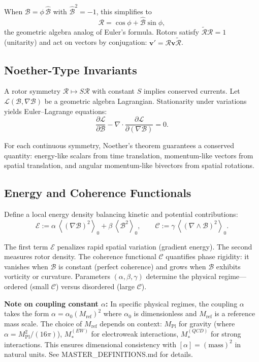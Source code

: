\documentclass[11pt,a4paper]{article}
\newcommand{\grade}[2]{\left\langle #1 \right\rangle_{#2}}
\newcommand{\scal}[1]{\grade{#1}{0}}
\newcommand{\rev}[1]{\widetilde{#1}}           %
\newcommand{\Rotor}{\mathcal{R}}
\newcommand{\Biv}{\mathcal{B}}
\newcommand{\D}{\nabla}                        %
\theoremstyle{definition}
\theoremstyle{plain}
\theoremstyle{remark}
\begin{document}
When $\Biv = \phi\,\hat{\Biv}$ with $\hat{\Biv}^2 = -1$, this simplifies to
\begin{equation}
\Rotor = \cos\phi + \hat{\Biv}\sin\phi,
\end{equation}
the geometric algebra analog of Euler's formula. Rotors satisfy $\rev{\Rotor}\Rotor = 1$ (unitarity) and act on vectors by conjugation: $\mathbf{v}' = \Rotor \mathbf{v} \rev{\Rotor}$.

\subsection{Noether-Type Invariants}

A rotor symmetry $\Rotor\mapsto S\Rotor$ with constant $S$ implies conserved currents. Let $\mathcal{L}(\Biv,\D\Biv)$ be a geometric algebra Lagrangian. Stationarity under variations yields Euler--Lagrange equations:
\begin{equation}
\frac{\partial \mathcal{L}}{\partial \Biv} - \D \cdot \frac{\partial \mathcal{L}}{\partial (\D\Biv)} = 0.
\end{equation}

For each continuous symmetry, Noether's theorem guarantees a conserved quantity: energy-like scalars from time translation, momentum-like vectors from spatial translation, and angular momentum-like bivectors from spatial rotations.

\subsection{Energy and Coherence Functionals}

Define a local energy density balancing kinetic and potential contributions:
\begin{equation}
  \mathcal{E} := \alpha\, \scal{(\D \Biv)^2} + \beta\, \scal{\Biv^2},
  \qquad
  \mathcal{C} := \gamma\, \scal{(\D\wedge\Biv)^2}.
\end{equation}

The first term $\mathcal{E}$ penalizes rapid spatial variation (gradient energy). The second measures rotor density. The coherence functional $\mathcal{C}$ quantifies phase rigidity: it vanishes when $\Biv$ is constant (perfect coherence) and grows when $\Biv$ exhibits vorticity or curvature. Parameters $(\alpha,\beta,\gamma)$ determine the physical regime---ordered (small $\mathcal{C}$) versus disordered (large $\mathcal{C}$).

\textbf{Note on coupling constant $\alpha$:} In specific physical regimes, the coupling $\alpha$ takes the form $\alpha = \alpha_0 (M_{\text{ref}})^2$ where $\alpha_0$ is dimensionless and $M_{\text{ref}}$ is a reference mass scale. The choice of $M_{\text{ref}}$ depends on context: $M_{\text{Pl}}$ for gravity (where $\alpha = M_{\text{Pl}}^2/(16\pi)$), $M_*^{(EW)}$ for electroweak interactions, $M_*^{(QCD)}$ for strong interactions. This ensures dimensional consistency with $[\alpha] = (\text{mass})^2$ in natural units. See MASTER\_DEFINITIONS.md for details.
\end{document}
